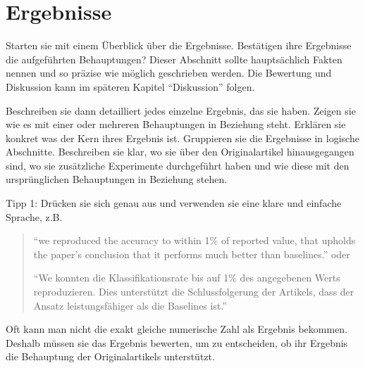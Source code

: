 \documentclass[DIV=13,fontsize=11pt]{scrartcl}
\begin{document}
\section{Ergebnisse}
Starten sie mit einem Überblick über die Ergebnisse.
Bestätigen ihre Ergebnisse die aufgeführten Behauptungen?
Dieser Abschnitt sollte hauptsächlich Fakten nennen und so präzise wie möglich geschrieben werden.
Die Bewertung und Diskussion kann im späteren Kapitel ``Diskussion'' folgen. 


Beschreiben sie dann detailliert jedes einzelne Ergebnis, das sie haben.
Zeigen sie wie es mit einer oder mehreren Behauptungen in Beziehung steht.
Erklären sie konkret was der Kern ihres Ergebnis ist.
Gruppieren sie die Ergebnisse in logische Abschnitte.
Beschreiben sie klar, wo sie über den Originalartikel hinausgegangen sind, wo sie zusätzliche Experimente durchgeführt haben und wie diese mit den ursprünglichen Behauptungen in Beziehung stehen.


Tipp 1: Drücken sie sich genau aus und verwenden sie eine klare und einfache Sprache, z.B. 
\begin{quote}
    ``we reproduced the accuracy to within 1\% of reported value, that upholds the paper's conclusion that it performs much better than baselines.'' oder

    ``We konnten die Klassifikationsrate bis auf 1\% des angegebenen Werts reproduzieren. Dies unterstützt die Schlussfolgerung der Artikels, dass der Ansatz leistungsfähiger als die Baselines ist.''
\end{quote}
Oft kann man nicht die exakt gleiche numerische Zahl als Ergebnis bekommen. Deshalb müssen sie das Ergebnis bewerten, um zu entscheiden, ob ihr Ergebnis die Behauptung der Originalartikels unterstützt.
\end{document}

